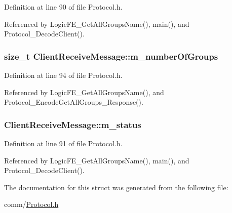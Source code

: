 Definition at line 90 of file Protocol.\+h.



Referenced by Logic\+F\+E\+\_\+\+Get\+All\+Groups\+Name(), main(), and Protocol\+\_\+\+Decode\+Client().

\subsubsection[{\texorpdfstring{m\+\_\+number\+Of\+Groups}{m_numberOfGroups}}]{\setlength{\rightskip}{0pt plus 5cm}size\+\_\+t Client\+Receive\+Message\+::m\+\_\+number\+Of\+Groups}\hypertarget{structClientReceiveMessage_ac7c80fba616c9836a1dc043838b0b4ed}{}\label{structClientReceiveMessage_ac7c80fba616c9836a1dc043838b0b4ed}


Definition at line 94 of file Protocol.\+h.



Referenced by Logic\+F\+E\+\_\+\+Get\+All\+Groups\+Name(), and Protocol\+\_\+\+Encode\+Get\+All\+Groups\+\_\+\+Response().

\subsubsection[{\texorpdfstring{m\+\_\+status}{m_status}}]{ Client\+Receive\+Message\+::m\+\_\+status}\hypertarget{structClientReceiveMessage_a3f5eb262b68916035c8268e906a4ee32}{}\label{structClientReceiveMessage_a3f5eb262b68916035c8268e906a4ee32}


Definition at line 91 of file Protocol.\+h.



Referenced by Logic\+F\+E\+\_\+\+Get\+All\+Groups\+Name(), main(), and Protocol\+\_\+\+Decode\+Client().



The documentation for this struct was generated from the following file\+:\begin{DoxyCompactItemize}
\item 
comm/\hyperlink{Protocol_8h}{Protocol.\+h}\end{DoxyCompactItemize}
